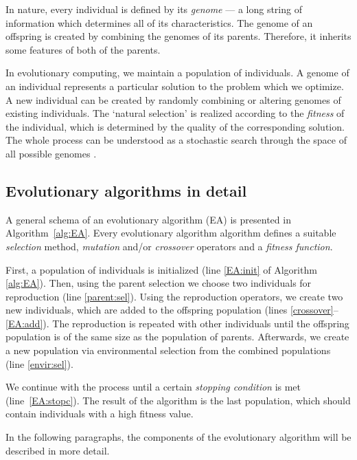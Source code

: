In nature, every individual is defined by its \emph{genome} --- a long string
of information which determines all of its characteristics. The genome of an
offspring is created by combining the genomes of its parents. Therefore, it
inherits some features of both of the parents.

In evolutionary computing, we maintain a population of individuals. A
ge\-no\-me of an individual represents a particular solution to the problem
which we optimize. A new individual can be created by randomly combining or
altering genomes of existing individuals. The `natural selection' is realized
according to the \emph{fitness} of the individual, which is determined by the
quality of the corresponding solution. The whole process can be understood as
a stochastic search through the space of all possible genomes
\citep{Engelbrecht:2007:CII:1557464}.

\subsection{Evolutionary algorithms in detail}
A general schema of an evolutionary algorithm (EA) is presented in
Algorithm~\ref{alg:EA}. Every evolutionary algorithm
algorithm defines a suitable \emph{selection} method, \emph{mutation}
and/or \emph{crossover} operators and a \emph{fitness function}.

First, a population  of individuals is initialized (line \ref{EA:init} of Algorithm
\ref{alg:EA}). Then, using the parent selection we choose two individuals for
reproduction (line \ref{parent:sel}). Using the reproduction operators, we create
two new individuals, which are added to the offspring population
(lines \ref{crossover}--\ref{EA:add}). The reproduction is
repeated with other individuals until the offspring population is of the same size
as the population of parents. Afterwards, we create a new population via
environmental selection from the combined populations (line \ref{envir:sel}).

We continue with the process until a certain \emph{stopping condition} is met
(line~\ref{EA:stopc}). The result of the algorithm is the last population, which
should contain individuals with a high fitness value.

In the following paragraphs, the components of the evolutionary algorithm
will be described in more detail.

